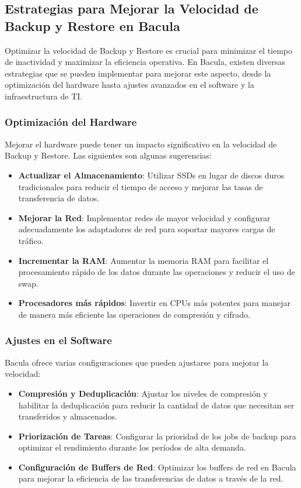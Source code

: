 \subsection{Estrategias para Mejorar la Velocidad de Backup y Restore en Bacula}

Optimizar la velocidad de Backup y Restore es crucial para minimizar el tiempo de inactividad y maximizar la eficiencia operativa. En Bacula, existen diversas estrategias que se pueden implementar para mejorar este aspecto, desde la optimización del hardware hasta ajustes avanzados en el software y la infraestructura de TI.

\subsubsection{Optimización del Hardware}

Mejorar el hardware puede tener un impacto significativo en la velocidad de Backup y Restore. Las siguientes son algunas sugerencias:

\begin{itemize}
    \item \textbf{Actualizar el Almacenamiento}: Utilizar SSDs en lugar de discos duros tradicionales para reducir el tiempo de acceso y mejorar las tasas de transferencia de datos.
    \item \textbf{Mejorar la Red}: Implementar redes de mayor velocidad y configurar adecuadamente los adaptadores de red para soportar mayores cargas de tráfico.
    \item \textbf{Incrementar la RAM}: Aumentar la memoria RAM para facilitar el procesamiento rápido de los datos durante las operaciones y reducir el uso de swap.
    \item \textbf{Procesadores más rápidos}: Invertir en CPUs más potentes para manejar de manera más eficiente las operaciones de compresión y cifrado.
\end{itemize}

\subsubsection{Ajustes en el Software}

Bacula ofrece varias configuraciones que pueden ajustarse para mejorar la velocidad:

\begin{itemize}
    \item \textbf{Compresión y Deduplicación}: Ajustar los niveles de compresión y habilitar la deduplicación para reducir la cantidad de datos que necesitan ser transferidos y almacenados.
    \item \textbf{Priorización de Tareas}: Configurar la prioridad de los jobs de backup para optimizar el rendimiento durante los períodos de alta demanda.
    \item \textbf{Configuración de Buffers de Red}: Optimizar los buffers de red en Bacula para mejorar la eficiencia de las transferencias de datos a través de la red.
\end{itemize}

